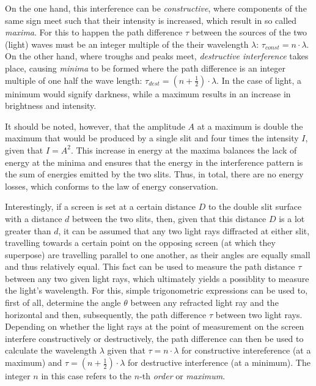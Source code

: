 On the one hand, this interference can be \emph{constructive}, where components of the same sign meet such that their intensity is increased, which result in so called \emph{maxima}. For this to happen the path difference $\tau$ between the sources of the two (light) waves must be an integer multiple of the their wavelength $\lambda$: $\tau_{const} = n \cdot \lambda$. On the other hand, where troughs and peaks meet, \emph{destructive interference} takes place, causing \emph{minima} to be formed where the path difference is an integer multiple of one half the wave length: $\tau_{dest} = (n + \frac{1}{2}) \cdot \lambda$. In the case of light, a minimum would signify darkness, while a maximum results in an increase in brightness and intensity. 

It should be noted, however, that the amplitude $A$ at a maximum is double the maximum that would be produced by a single slit and four times the intensity $I$, given that $I = A^2$. This increase in energy at the maxima balances the lack of energy at the minima and ensures that the energy in the interference pattern is the sum of energies emitted by the two slits. Thus, in total, there are no energy losses, which conforms to the law of energy conservation.

Interestingly, if a screen is set at a certain distance $D$ to the double slit surface with a distance $d$ between the two slits, then, given that this distance $D$ is a lot greater than $d$, it can be assumed that any two light rays diffracted at either slit, travelling towards a certain point on the opposing screen (at which they superpose) are travelling parallel to one another, as their angles are equally small and thus relatively equal. This fact can be used to measure the path distance $\tau$ between any two given light rays, which ultimately yields a possiblity to measure the light's wavelength. For this, simple trigonometric expressions can be used to, first of all, determine the angle $\theta$ between any refracted light ray and the horizontal and then, subsequently, the path difference $\tau$ between two light rays. Depending on whether the light rays at the point of measurement on the screen interfere constructively or destructively, the path difference can then be used to calculate the wavelength $\lambda$ given that $\tau = n \cdot \lambda$ for constructive intereference (at a maximum) and $\tau = (n + \frac{1}{2}) \cdot \lambda$ for destructive interference (at a minimum). The integer $n$ in this case refers to the $n$-th \emph{order} or \emph{maximum}.

